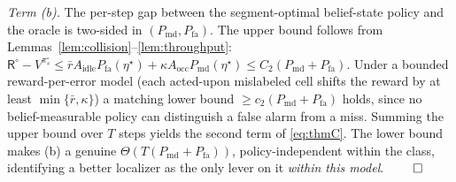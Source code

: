 \documentclass[journal]{IEEEtran}
\newcommand{\Pmd}{P_{\mathrm{md}}}         %
\newcommand{\Pfa}{P_{\mathrm{fa}}}         %
\newcommand{\thr}{\eta}                    %
\newcommand{\pol}{\pi}                     %
\newcommand{\bigT}{T}                      %
\newcommand{\thru}{\mathsf{R}}             %
\begin{document}
\emph{Term (b).} The per-step gap between the segment-optimal belief-state
policy and the oracle is two-sided in $(\Pmd,\Pfa)$. The upper bound follows
from Lemmas~\ref{lem:collision}--\ref{lem:throughput}:
$\thru^{\circ}-V^{\pol^{\circ}_s}\le \bar r A_{\mathrm{idle}}\Pfa(\thr^\star)
+\kappa A_{\mathrm{occ}}\Pmd(\thr^\star)\le C_2(\Pmd+\Pfa)$. Under a
bounded reward-per-error model (each acted-upon mislabeled cell shifts the
reward by at least $\min\{\bar r,\kappa\}$) a matching lower bound
$\ge c_2(\Pmd+\Pfa)$ holds, since no belief-measurable policy can distinguish
a false alarm from a miss. Summing the upper bound over $\bigT$ steps yields
the second term of \eqref{eq:thmC}. The lower bound makes (b) a genuine
$\Theta(\bigT(\Pmd+\Pfa))$, policy-independent within the class, identifying a
better localizer as the only lever on it \emph{within this model}.
\hfill$\qed$
\end{document}
